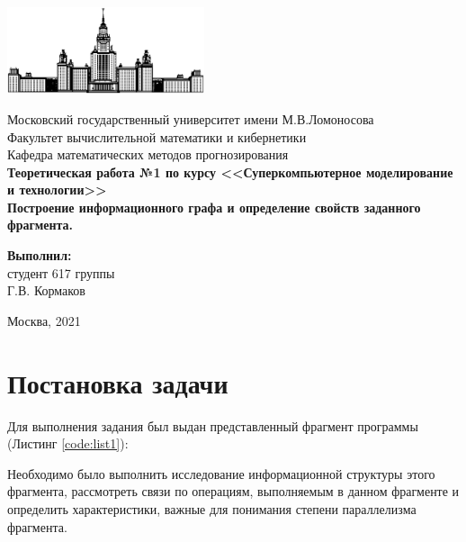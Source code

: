 \documentclass[12pt, fleqn]{article}
\theoremstyle{definition}
\begin{document}
\hypersetup{pageanchor=false}
\begin{titlepage}
\begin{center}
    \includegraphics[width=58mm]{msu.eps}
    
    Московский государственный университет имени М.В.Ломоносова\\
    Факультет вычислительной математики и кибернетики\\
    Кафедра математических методов прогнозирования\\[25mm]

    \textsf{
        \Large\bfseries 
        Теоретическая работа №1 по курсу <<Суперкомпьютерное моделирование и технологии>>
        \\[5mm] 
        Построение информационного графа и определение свойств заданного фрагмента.
    }\\[12mm]
    
    \begin{flushright}
        \parbox{0.5\textwidth}{
        \begin{flushright}
            \textbf{Выполнил:}\\
            студент 617 группы \\
            Г.В. Кормаков
        \end{flushright}
        }
    \end{flushright}

    \vspace{\fill}
    Москва, 2021
\end{center}

\end{titlepage}
\hypersetup{pageanchor=true}
\tableofcontents
\newpage
\section{Постановка задачи}
Для выполнения задания был выдан представленный фрагмент программы (Листинг \ref{code:list1}):
{}

Необходимо было выполнить исследование информационной структуры этого фрагмента, рассмотреть связи по операциям, выполняемым в данном фрагменте и определить характеристики, важные для понимания степени параллелизма фрагмента.
\end{document}
